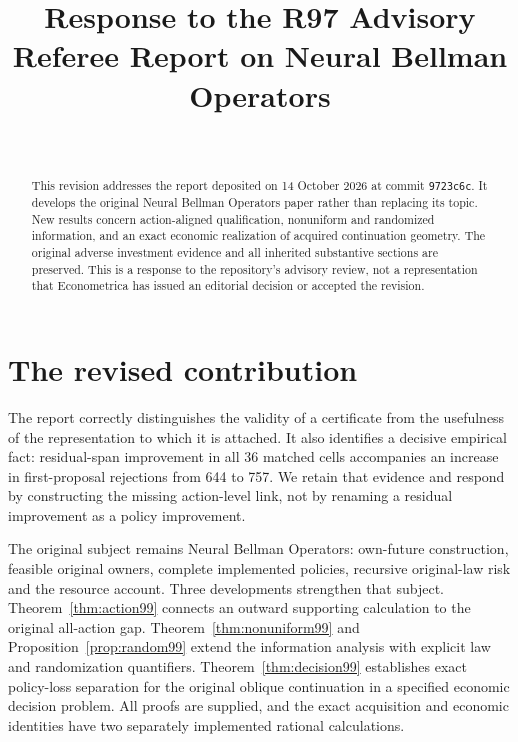 \documentclass[ecta,nameyear,draft]{econsocart}
\begin{document}
\begin{frontmatter}
\title{Response to the R97 Advisory Referee Report on Neural Bellman Operators}
\begin{aug}
\author[id=au1,addressref={add1}]{~}
\address[id=add1]{Peking University}
\end{aug}
\begin{abstract}
This revision addresses the report deposited on 14 October 2026 at commit \texttt{9723c6c}. It develops the original Neural Bellman Operators paper rather than replacing its topic. New results concern action-aligned qualification, nonuniform and randomized information, and an exact economic realization of acquired continuation geometry. The original adverse investment evidence and all inherited substantive sections are preserved. This is a response to the repository's advisory review, not a representation that Econometrica has issued an editorial decision or accepted the revision.
\end{abstract}
\end{frontmatter}

\section{The revised contribution}
The report correctly distinguishes the validity of a certificate from the usefulness of the representation to which it is attached. It also identifies a decisive empirical fact: residual-span improvement in all 36 matched cells accompanies an increase in first-proposal rejections from 644 to 757. We retain that evidence and respond by constructing the missing action-level link, not by renaming a residual improvement as a policy improvement.

The original subject remains Neural Bellman Operators: own-future construction, feasible original owners, complete implemented policies, recursive original-law risk and the resource account. Three developments strengthen that subject. Theorem~\ref{thm:action99} connects an outward supporting calculation to the original all-action gap. Theorem~\ref{thm:nonuniform99} and Proposition~\ref{prop:random99} extend the information analysis with explicit law and randomization quantifiers. Theorem~\ref{thm:decision99} establishes exact policy-loss separation for the original oblique continuation in a specified economic decision problem. All proofs are supplied, and the exact acquisition and economic identities have two separately implemented rational calculations.
\end{document}
